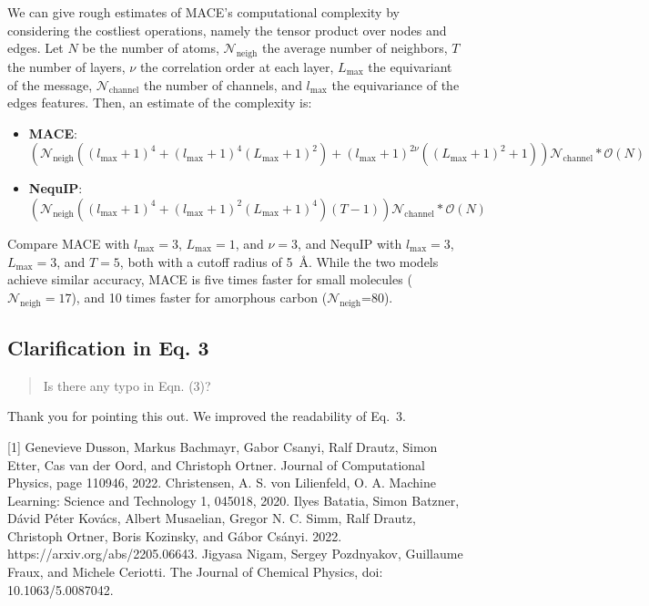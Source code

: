\documentclass{article}
\begin{document}
We can give rough estimates of MACE's computational complexity by considering the costliest operations,
namely the tensor product over nodes and edges.
Let $N$ be the number of atoms, 
$\mathcal{N}_\text{neigh}$ the average number of neighbors,
$T$ the number of layers,
$\nu$ the correlation order at each layer, 
$L_{\text{max}}$ the equivariant of the message, 
$\mathcal{N}_\text{channel}$ the number of channels,
and $l_{\text{max}}$ the equivariance of the edges features.
Then, an estimate of the complexity is:
\begin{itemize}
\item \textbf{MACE}: $\left(\mathcal{N}_\text{neigh} \left(\left(l_{\text{max}}+1\right)^{4} + \left(l_{\text{max}}+1\right)^{4} (L_{\text{max}}+1)^{2}\right) + \left(l_{\text{max}}+1\right)^{2\nu} \left(\left(L_{\text{max}} + 1\right)^{2} + 1\right) \right) \mathcal{N}_\text{channel}* \mathcal{O}(N) $
\item \textbf{NequIP}: $\left(\mathcal{N}_\text{neigh} \left(\left(l_{\text{max}}+1\right)^{4} + \left(l_{\text{max}}+1\right)^{2} \left(L_{\text{max}}+1\right)^{4}\right) (T-1) \right) \mathcal{N}_\text{channel}*\mathcal{O}(N)$
\end{itemize}

Compare MACE with $l_{\text{max}}=3$, $L_{\text{max}}=1$, and $\nu=3$,
and NequIP with $l_{\text{max}}=3$, $L_{\text{max}}=3$, and $T=5$, both with a cutoff radius of 5~\AA{}.
While the two models achieve similar accuracy,
MACE is five times faster for small molecules ($\mathcal{N}_\text{neigh} = 17$),
and 10 times faster for amorphous carbon ($\mathcal{N}_\text{neigh}$=80).

\subsection*{Clarification in Eq. 3}
\begin{quote}
Is there any typo in Eqn. (3)? 
\end{quote}
Thank you for pointing this out. 
We improved the readability of Eq.~3. \newline


[1] Genevieve Dusson, Markus Bachmayr, Gabor Csanyi, Ralf Drautz, Simon Etter, Cas van der Oord, and Christoph Ortner. Journal of Computational Physics, page 110946, 2022.
\newline
[2] Christensen, A. S.  von Lilienfeld, O. A. Machine Learning: Science and Technology 1, 045018, 2020. \newline
[3] Ilyes Batatia, Simon Batzner, Dávid Péter Kovács, Albert Musaelian, Gregor N. C. Simm,
Ralf Drautz, Christoph Ortner, Boris Kozinsky, and Gábor Csányi. 2022. https://arxiv.org/abs/2205.06643. \newline
[4] Jigyasa Nigam, Sergey Pozdnyakov, Guillaume Fraux, and Michele Ceriotti. The Journal of Chemical Physics, doi: 10.1063/5.0087042.
\end{document}
